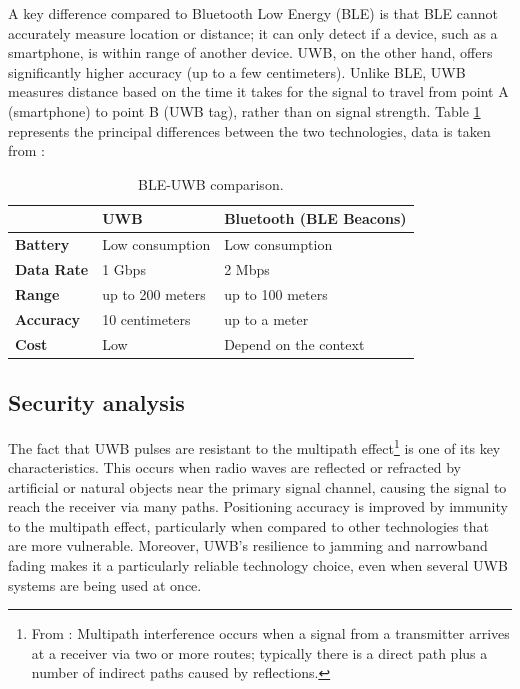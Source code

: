 \documentclass[english]{article}
\begin{document}
A key difference compared to Bluetooth Low Energy (BLE) is that BLE cannot accurately measure location or distance; it can only detect if a device, such as a smartphone, is within range of another device. UWB, on the other hand, offers significantly higher accuracy (up to a few centimeters). Unlike BLE, UWB measures distance based on the time it takes for the signal to travel from point A (smartphone) to point B (UWB tag), rather than on signal strength. Table \ref{tableu} represents the principal differences between the two technologies, data is taken from \cite{encstore}:
\begin{table}[h] 
\caption{BLE-UWB comparison.}
  \centering
  
    \begin{tabular}{l|l|l|}
      \cline{2-3}
      {}                               & {\textbf{UWB}}                & { \textbf{Bluetooth (BLE Beacons)}} \\ \hline
      \multicolumn{1}{|l|}{{  \textbf{Battery}}}  & {  Low consumption}             & {  Low consumption}                  \\ \hline
      \multicolumn{1}{|l|}{{  \textbf{Data Rate}}}  & { 1 Gbps }             & { 2 Mbps }                  \\ \hline
      \multicolumn{1}{|l|}{{  \textbf{Range}}}    & {  up to 200 meters} & {  up to 100 meters}       \\ \hline
      \multicolumn{1}{|l|}{{  \textbf{Accuracy}}} & {  10 centimeters} & {  up to a meter}                    \\ \hline
      \multicolumn{1}{|l|}{{  \textbf{Cost}}}     & {  Low}                         & {Depend on the context }                              \\ \hline
    \end{tabular}
    \label{tableu}
  \end{table}

\subsection{Security analysis}
The fact that UWB pulses are resistant to the multipath effect\footnote{From \cite{Figueroa2022}: Multipath interference occurs when a signal from a transmitter arrives at a receiver via two or more routes; typically there is a direct path plus a number of indirect paths caused by reflections.} is one of its key characteristics. This occurs when radio waves are reflected or refracted by artificial or natural objects near the primary signal channel, causing the signal to reach the receiver via many paths. Positioning accuracy is improved by immunity to the multipath effect, particularly when compared to other technologies that are more vulnerable. Moreover, UWB's resilience to jamming and narrowband fading makes it a particularly reliable technology choice, even when several UWB systems are being used at once.
\end{document}
